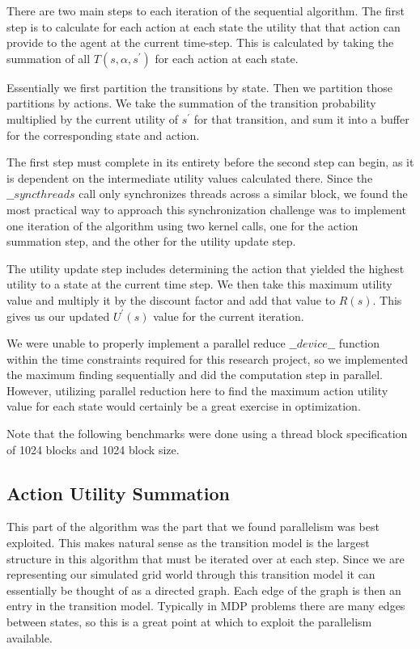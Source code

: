\documentclass[letterpaper,twocolumn,10pt]{article}
\begin{document}
{There are two main steps to each iteration of the sequential algorithm. The first step is to calculate for each action at each state the utility that that action can provide to the agent at the current time-step. This is calculated by taking the summation of all $T(s,\alpha,s^\prime)$ for each action at each state. 

Essentially we first partition the transitions by state. Then we partition those partitions by actions. We take the summation of the transition probability multiplied by the current utility of $s^\prime$ for that transition, and sum it into a buffer for the corresponding state and action.

The first step must complete in its entirety before the second step can begin, as it is dependent on the intermediate utility values calculated there. Since the $\_\_syncthreads$ call only synchronizes threads across a similar block, we found the most practical way to approach this synchronization challenge was to implement one iteration of the algorithm using two kernel calls, one for the action summation step, and the other for the utility update step.

The utility update step includes determining the action that yielded the highest utility to a state at the current time step. We then take this maximum utility value and multiply it by the discount factor and add that value to $R(s)$. This gives us our updated $U^\prime(s)$ value for the current iteration.

We were unable to properly implement a parallel reduce $\_\_device\_\_$ function within the time constraints required for this research project, so we implemented the maximum finding sequentially and did the computation step in parallel. However, utilizing parallel reduction here to find the maximum action utility value for each state would certainly be a great exercise in optimization.

\scriptsize 
Note that the following benchmarks were done using a thread block specification of 1024 blocks and 1024 block size.
\normalsize

\subsection{Action Utility Summation}

This part of the algorithm was the part that we found parallelism was best exploited. This makes natural sense as the transition model is the largest structure in this algorithm that must be iterated over at each step. Since we are representing our simulated grid world through this transition model it can essentially be thought of as a directed graph. Each edge of the graph is then an entry in the transition model. Typically in MDP problems there are many edges between states, so this is a great point at which to exploit the parallelism available.

}
\end{document}
